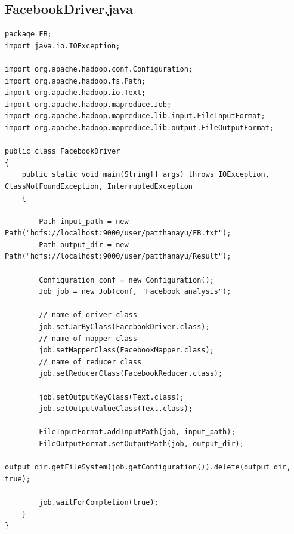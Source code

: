 \documentclass[11pt]{article}
\begin{document}
\newpage
\subsection*{FacebookDriver.java}
\begin{lstlisting}
package FB;
import java.io.IOException;

import org.apache.hadoop.conf.Configuration;
import org.apache.hadoop.fs.Path;
import org.apache.hadoop.io.Text;
import org.apache.hadoop.mapreduce.Job;
import org.apache.hadoop.mapreduce.lib.input.FileInputFormat;
import org.apache.hadoop.mapreduce.lib.output.FileOutputFormat;

public class FacebookDriver 
{
	public static void main(String[] args) throws IOException,	ClassNotFoundException, InterruptedException 
	{

		Path input_path = new Path("hdfs://localhost:9000/user/patthanayu/FB.txt");
		Path output_dir = new Path("hdfs://localhost:9000/user/patthanayu/Result");

		Configuration conf = new Configuration();
		Job job = new Job(conf, "Facebook analysis");

		// name of driver class
		job.setJarByClass(FacebookDriver.class);
		// name of mapper class
		job.setMapperClass(FacebookMapper.class);
		// name of reducer class
		job.setReducerClass(FacebookReducer.class);
					
		job.setOutputKeyClass(Text.class);
		job.setOutputValueClass(Text.class);

		FileInputFormat.addInputPath(job, input_path);
		FileOutputFormat.setOutputPath(job, output_dir);
		output_dir.getFileSystem(job.getConfiguration()).delete(output_dir,	true);

		job.waitForCompletion(true);
	}
}
\end{lstlisting}
\end{document}
